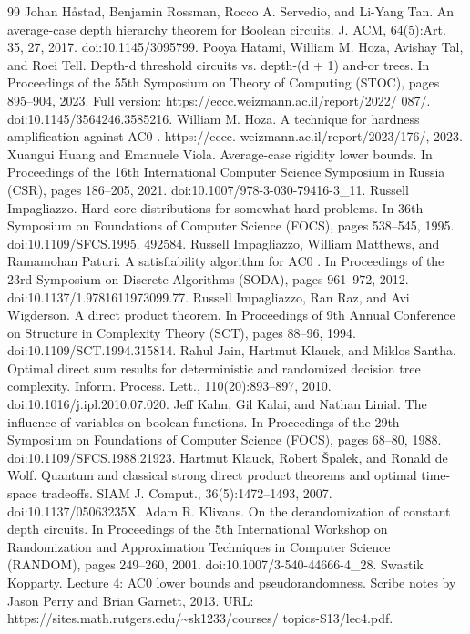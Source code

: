 \documentclass[10pt,a4paper]{article}
\begin{document}
\begin{thebibliography}{99}
 Johan Håstad, Benjamin Rossman, Rocco A. Servedio, and Li-Yang Tan. An average-case depth hierarchy theorem for Boolean circuits. J. ACM, 64(5):Art. 35, 27, 2017. doi:10.1145/3095799.
 Pooya Hatami, William M. Hoza, Avishay Tal, and Roei Tell. Depth-d threshold circuits vs. depth-(d + 1) and-or trees. In Proceedings of the 55th Symposium on Theory of Computing (STOC), pages 895–904, 2023. Full version: https://eccc.weizmann.ac.il/report/2022/ 087/. doi:10.1145/3564246.3585216.   
 William M. Hoza. A technique for hardness amplification against AC0 . https://eccc. weizmann.ac.il/report/2023/176/, 2023.
 Xuangui Huang and Emanuele Viola. Average-case rigidity lower bounds. In Proceedings of the 16th International Computer Science Symposium in Russia (CSR), pages 186–205, 2021. doi:10.1007/978-3-030-79416-3\_11.
 Russell Impagliazzo. Hard-core distributions for somewhat hard problems. In 36th Symposium on Foundations of Computer Science (FOCS), pages 538–545, 1995. doi:10.1109/SFCS.1995. 492584.
 Russell Impagliazzo, William Matthews, and Ramamohan Paturi. A satisfiability algorithm for AC0 . In Proceedings of the 23rd Symposium on Discrete Algorithms (SODA), pages 961–972, 2012. doi:10.1137/1.9781611973099.77.
 Russell Impagliazzo, Ran Raz, and Avi Wigderson. A direct product theorem. In Proceedings of 9th Annual Conference on Structure in Complexity Theory (SCT), pages 88–96, 1994. doi:10.1109/SCT.1994.315814.
 Rahul Jain, Hartmut Klauck, and Miklos Santha. Optimal direct sum results for deterministic and randomized decision tree complexity. Inform. Process. Lett., 110(20):893–897, 2010. doi:10.1016/j.ipl.2010.07.020.
 Jeff Kahn, Gil Kalai, and Nathan Linial. The influence of variables on boolean functions. In Proceedings of the 29th Symposium on Foundations of Computer Science (FOCS), pages 68–80, 1988. doi:10.1109/SFCS.1988.21923.
 Hartmut Klauck, Robert Špalek, and Ronald de Wolf. Quantum and classical strong direct product theorems and optimal time-space tradeoffs. SIAM J. Comput., 36(5):1472–1493, 2007. doi:10.1137/05063235X.
 Adam R. Klivans. On the derandomization of constant depth circuits. In Proceedings of the 5th International Workshop on Randomization and Approximation Techniques in Computer Science (RANDOM), pages 249–260, 2001. doi:10.1007/3-540-44666-4\_28.
 Swastik Kopparty. Lecture 4: AC0 lower bounds and pseudorandomness. Scribe notes by Jason Perry and Brian Garnett, 2013. URL: https://sites.math.rutgers.edu/\textasciitilde{}sk1233/courses/ topics-S13/lec4.pdf.

\end{thebibliography}
\end{document}
